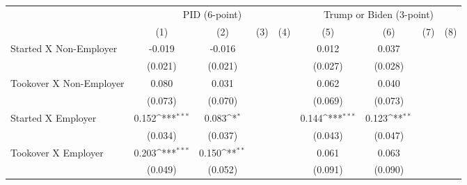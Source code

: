 {
\def\sym#1{\ifmmode^{#1}\else\(^{#1}\)\fi}
\begin{tabular}{l*{8}{c}}
\hline\hline
                    &\multicolumn{4}{c}{PID (6-point)}                                                      &\multicolumn{4}{c}{Trump or Biden (3-point)}                                           \\
                    &\multicolumn{1}{c}{(1)}         &\multicolumn{1}{c}{(2)}         &\multicolumn{1}{c}{(3)}         &\multicolumn{1}{c}{(4)}         &\multicolumn{1}{c}{(5)}         &\multicolumn{1}{c}{(6)}         &\multicolumn{1}{c}{(7)}         &\multicolumn{1}{c}{(8)}         \\
\hline
Started X Non-Employer&      -0.019         &      -0.016         &                     &                     &       0.012         &       0.037         &                     &                     \\
                    &     (0.021)         &     (0.021)         &                     &                     &     (0.027)         &     (0.028)         &                     &                     \\
Tookover X Non-Employer&       0.080         &       0.031         &                     &                     &       0.062         &       0.040         &                     &                     \\
                    &     (0.073)         &     (0.070)         &                     &                     &     (0.069)         &     (0.073)         &                     &                     \\
Started X Employer  &       0.152\sym{***}&       0.083\sym{*}  &                     &                     &       0.144\sym{***}&       0.123\sym{**} &                     &                     \\
                    &     (0.034)         &     (0.037)         &                     &                     &     (0.043)         &     (0.047)         &                     &                     \\
Tookover X Employer &       0.203\sym{***}&       0.150\sym{**} &                     &                     &       0.061         &       0.063         &                     &                     \\
                    &     (0.049)         &     (0.052)         &                     &                     &     (0.091)         &     (0.090)         &                     &                     \\

\end{tabular}}
